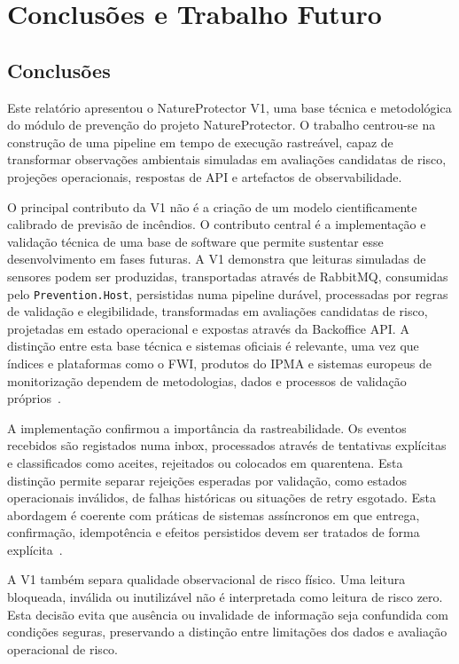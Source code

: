 \chapter{Conclusões e Trabalho Futuro}

\section{Conclusões}

Este relatório apresentou o NatureProtector V1, uma base técnica e metodológica do módulo de prevenção do projeto NatureProtector. O trabalho centrou-se na construção de uma pipeline em tempo de execução rastreável, capaz de transformar observações ambientais simuladas em avaliações candidatas de risco, projeções operacionais, respostas de API e artefactos de observabilidade.

O principal contributo da V1 não é a criação de um modelo cientificamente calibrado de previsão de incêndios. O contributo central é a implementação e validação técnica de uma base de software que permite sustentar esse desenvolvimento em fases futuras. A V1 demonstra que leituras simuladas de sensores podem ser produzidas, transportadas através de RabbitMQ, consumidas pelo \texttt{Prevention.Host}, persistidas numa pipeline durável, processadas por regras de validação e elegibilidade, transformadas em avaliações candidatas de risco, projetadas em estado operacional e expostas através da Backoffice API. A distinção entre esta base técnica e sistemas oficiais é relevante, uma vez que índices e plataformas como o FWI, produtos do IPMA e sistemas europeus de monitorização dependem de metodologias, dados e processos de validação próprios~\citep{nrcan_fwi_system,ipma_fwi,ipma_pir_rcm,ec_jrc_effis}.

A implementação confirmou a importância da rastreabilidade. Os eventos recebidos são registados numa inbox, processados através de tentativas explícitas e classificados como aceites, rejeitados ou colocados em quarentena. Esta distinção permite separar rejeições esperadas por validação, como estados operacionais inválidos, de falhas históricas ou situações de retry esgotado. Esta abordagem é coerente com práticas de sistemas assíncronos em que entrega, confirmação, idempotência e efeitos persistidos devem ser tratados de forma explícita~\citep{rabbitmq_consumer_acknowledgements,richardson_idempotent_consumer}.

A V1 também separa qualidade observacional de risco físico. Uma leitura bloqueada, inválida ou inutilizável não é interpretada como leitura de risco zero. Esta decisão evita que ausência ou invalidade de informação seja confundida com condições seguras, preservando a distinção entre limitações dos dados e avaliação operacional de risco.

